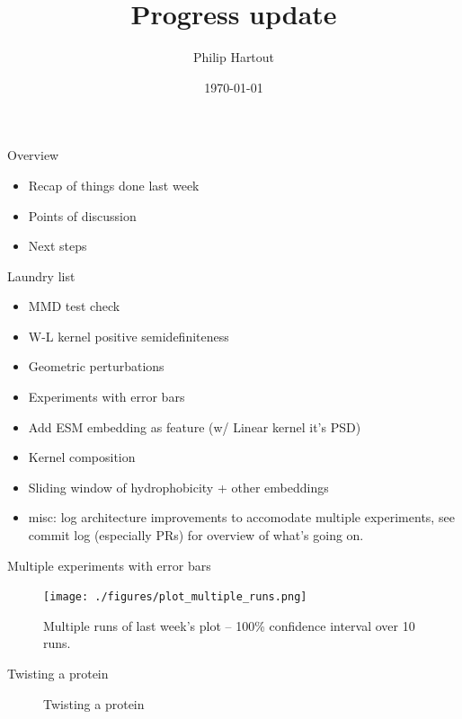 \documentclass[aspectratio=169, 10pt, dvipsnames]{beamer}
\title{Progress update}
\date{\today}
\author{Philip Hartout}
\begin{document}
\maketitle


\begin{frame}[fragile]{Overview}
  \begin{itemize}
  \item Recap of things done last week
  \item Points of discussion
  \item Next steps
  \end{itemize}
\end{frame}

\begin{frame}[fragile]{Laundry list}
  \begin{itemize}
  \item MMD test check
  \pause
\item W-L kernel positive semidefiniteness
  \pause
\item Geometric perturbations
  \pause
\item Experiments with error bars
  \pause
\item Add ESM embedding as feature (w/ Linear kernel it's PSD)
  \pause
\item Kernel composition
  \pause
\item Sliding window of hydrophobicity + other embeddings
  \pause
\item misc: log architecture improvements to accomodate multiple experiments,
  see commit log (especially PRs) for overview of what's going on.
  \pause
  \end{itemize}
\end{frame}

\begin{frame}[fragile]{Multiple experiments with error bars}
  \begin{figure}%
    \centering
    \texttt{[image: ./figures/plot\_multiple\_runs.png]}
    \caption{Multiple runs of last week's plot -- 100\% confidence interval
      over 10 runs.}%
  \end{figure}
\end{frame}


\begin{frame}[fragile]{Twisting a protein}
  \begin{figure}
    \centering
    \caption{Twisting a protein}
    \label{fig:twist}
  \end{figure}
\end{frame}
\end{document}
